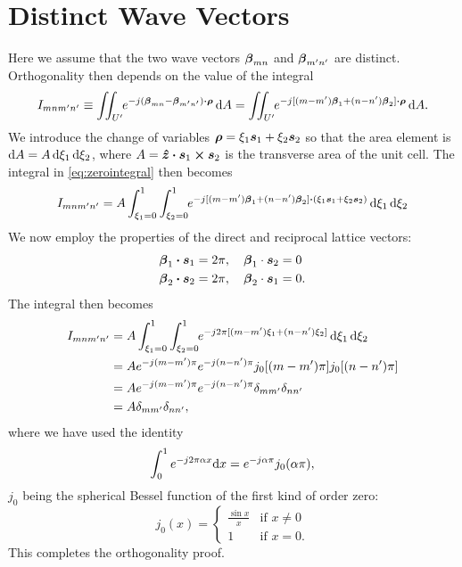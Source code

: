 \documentclass[
letterpaper, %
11pt, %
oneside, 
onecolumn, %
openany, %
]{memoir}
\numberwithin{equation}{chapter}
\numberwithin{figure}{chapter}
\begin{document}
\section{Distinct Wave Vectors}
Here we assume that the two wave vectors $\boldsymbol{\beta}_{mn}$ and
$\boldsymbol{\beta}_{m'n'}$ are distinct.  Orthogonality then depends on
the value of the integral
\begin{equation}
 I_{mnm'n'} \equiv \iint_{U'} \mkern -5mu
  e^{-j(\boldsymbol{\beta}_{mn} - \boldsymbol{\beta}_{m'n'}) \boldsymbol{\cdot} \boldsymbol{\rho}} \, \text{d} A
  =
  \iint_{U'} \mkern -5mu
  e^{-j[(m-m')\boldsymbol{\beta}_1 + (n-n')\boldsymbol{\beta}_2] \boldsymbol{\cdot} \boldsymbol{\rho}} \, \text{d} A.
\label{eq:zerointegral}
\end{equation}
We introduce the change of variables $\boldsymbol{\rho} = \xi_1\boldsymbol{s}_1 + \xi_2\boldsymbol{s}_2$
so that the area element is $\text{d} A = A \, \text{d} \xi_1 \, \text{d} \xi_2$, where $A
= \boldsymbol{\hat{z}} \boldsymbol{\cdot} \boldsymbol{s}_1 \boldsymbol{\times} \boldsymbol{s}_2$ is the transverse area of the unit cell.
The integral in \eqref{eq:zerointegral} then becomes
\begin{equation}
 I_{mnm'n'}=  A  \int_{\xi_1=0}^{1} \int_{\xi_2=0}^{1} \mkern -5mu
  e^{-j[(m-m')\boldsymbol{\beta}_1 + (n-n')\boldsymbol{\beta}_2] \boldsymbol{\cdot}
  (\xi_1\boldsymbol{s}_1+\xi_2\boldsymbol{s}_2)} \, \text{d} \xi_1 \, \text{d} \xi_2
\end{equation}
We now employ the properties of the direct and reciprocal lattice
vectors:
\begin{subequations}
  \begin{align}
    \boldsymbol{\beta}_1\boldsymbol{\cdot}\boldsymbol{s}_1 &= 2\pi, \quad \boldsymbol{\beta}_1\cdot\boldsymbol{s}_2 = 0 \\
    \boldsymbol{\beta}_2\boldsymbol{\cdot}\boldsymbol{s}_2 &= 2\pi, \quad \boldsymbol{\beta}_2\cdot\boldsymbol{s}_1 = 0.
  \end{align}
\end{subequations}
The integral then becomes
\begin{align}
  I_{mnm'n'} &= A \int_{\xi_1=0}^{1} \int_{\xi_2=0}^{1} \mkern -5mu
   e^{-j2\pi[(m-m')\xi_1 + (n-n')\xi_2]} \, \text{d} \xi_1 \, \text{d} \xi_2
   \nonumber \\
   &= A e^{-j(m-m')\pi} e^{-j(n-n')\pi} j_0[(m-m')\pi] j_0[(n-n')\pi]
   \nonumber \\
   &= A e^{-j(m-m')\pi} e^{-j(n-n')\pi} \delta_{mm'} \delta_{nn'}
   \nonumber \\
   &= A \delta_{mm'} \delta_{nn'},
\end{align}
where we have used the identity 
\begin{equation}
  \int_{0}^1 e^{-j2\pi\alpha x} \text{d} x = e^{-j\alpha\pi} j_0(\alpha\pi),
\end{equation}
$j_0$ being the spherical Bessel function of the first kind of order
zero:
\begin{equation}
  j_0(x) = 
  \begin{cases}
    \frac{\sin x}{x} & \text{if $x \neq 0$} \\
    1 & \text{if $x=0$}.
  \end{cases}
\end{equation}
This completes the orthogonality proof.
\end{document}
